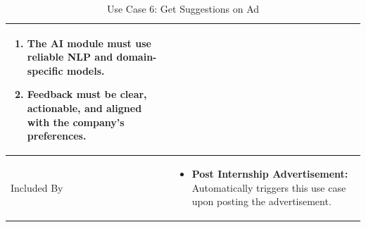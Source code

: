 \begin{table}[H]
\begin{tabular}{|l|p{12cm}|}
\begin{enumerate}
    \item The AI module must use reliable NLP and domain-specific models.
    \item Feedback must be clear, actionable, and aligned with the company's preferences.
\end{enumerate} \\ \hline
Included By      & 
\begin{itemize}
    \item \textbf{Post Internship Advertisement:} Automatically triggers this use case upon posting the advertisement.
\end{itemize} \\ \hline
\end{tabular}
\caption{Use Case 6: Get Suggestions on Ad}
\label{tab:get_suggestions_ad}
\end{table}

